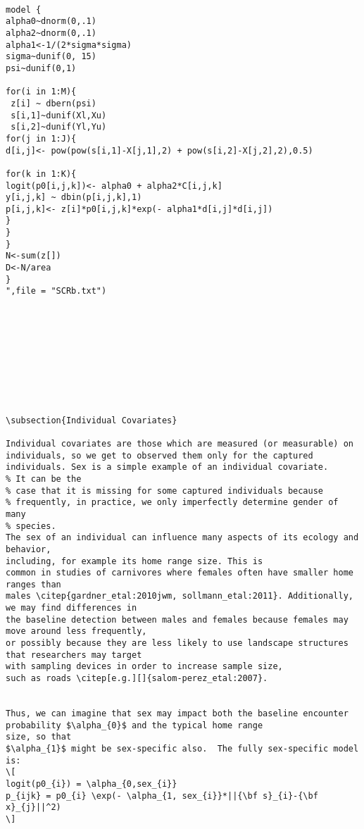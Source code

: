 {\small
\begin{verbatim}

model {
alpha0~dnorm(0,.1)
alpha2~dnorm(0,.1)
alpha1<-1/(2*sigma*sigma)
sigma~dunif(0, 15)
psi~dunif(0,1)

for(i in 1:M){
 z[i] ~ dbern(psi)
 s[i,1]~dunif(Xl,Xu)
 s[i,2]~dunif(Yl,Yu)
for(j in 1:J){
d[i,j]<- pow(pow(s[i,1]-X[j,1],2) + pow(s[i,2]-X[j,2],2),0.5)

for(k in 1:K){
logit(p0[i,j,k])<- alpha0 + alpha2*C[i,j,k]
y[i,j,k] ~ dbin(p[i,j,k],1)
p[i,j,k]<- z[i]*p0[i,j,k]*exp(- alpha1*d[i,j]*d[i,j])
}
}
}
N<-sum(z[])
D<-N/area
}
",file = "SCRb.txt")










\subsection{Individual Covariates}

Individual covariates are those which are measured (or measurable) on
individuals, so we get to observed them only for the captured
individuals. Sex is a simple example of an individual covariate. 
% It can be the
% case that it is missing for some captured individuals because
% frequently, in practice, we only imperfectly determine gender of many
% species.  
The sex of an individual can influence many aspects of its ecology and behavior, 
including, for example its home range size. This is
common in studies of carnivores where females often have smaller home ranges than
males \citep{gardner_etal:2010jwm, sollmann_etal:2011}. Additionally, we may find differences in
the baseline detection between males and females because females may move around less frequently, 
or possibly because they are less likely to use landscape structures that researchers may target 
with sampling devices in order to increase sample size, 
such as roads \citep[e.g.][]{salom-perez_etal:2007}. 


Thus, we can imagine that sex may impact both the baseline encounter
probability $\alpha_{0}$ and the typical home range
size, so that
$\alpha_{1}$ might be sex-specific also.  The fully sex-specific model is:
\[
logit(p0_{i}) = \alpha_{0,sex_{i}}
p_{ijk} = p0_{i} \exp(- \alpha_{1, sex_{i}}*||{\bf s}_{i}-{\bf x}_{j}||^2)
\]


\end{verbatim}}
